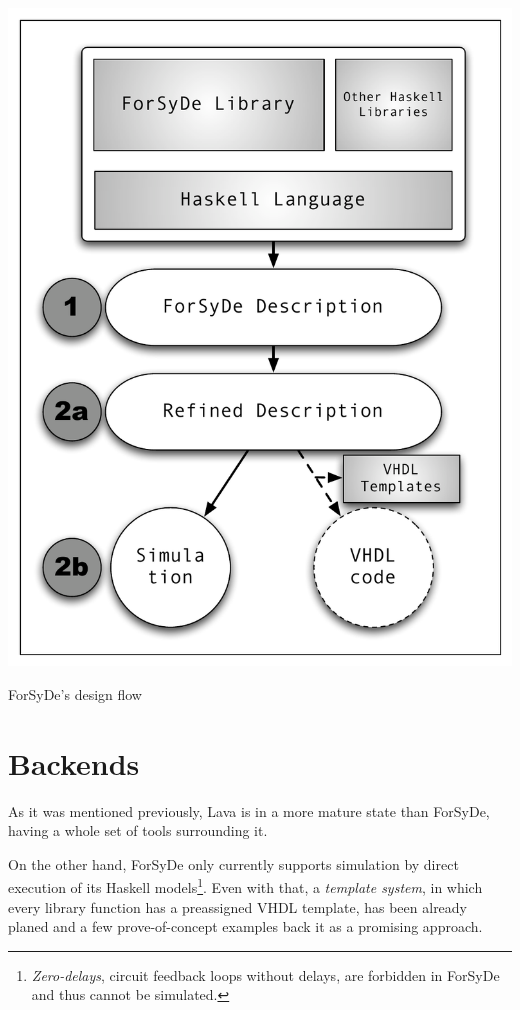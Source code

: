 \documentclass[a4paper,twoside,11pt]{article}
\begin{document}
\begin{body}
\begin{figurehere}
  \includegraphics[width=\columnwidth]{figures/ForSyDe.pdf}
  \caption{ForSyDe's design flow}
  \label{fig:forsyde}
\end{figurehere}

\section{Backends}
As it was mentioned previously, Lava is in a more mature state than
ForSyDe, having a whole set of tools surrounding it.

On the other hand, ForSyDe only currently supports simulation by
direct execution of its Haskell models\footnote{\textit{Zero-delays},
  circuit feedback loops without delays, are forbidden in ForSyDe and
  thus cannot be simulated.}. Even with that, a \textit{template
  system}, in which every library function has a preassigned VHDL
template, has been already planed and a few prove-of-concept
examples\cite[Chapter 6]{forsyde:thesis} back it as a promising
approach.


\end{body}
\end{document}

